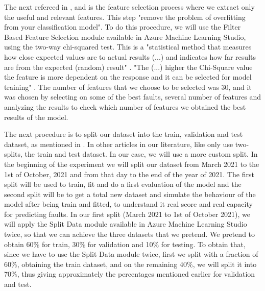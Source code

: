 The next refereed in \cite{ML_Data_processing}, \cite{N_4_WIND} and \cite{39_WIND} is the feature selection process where we extract only the useful and relevant features. This step "remove the problem of overfitting from your classification model". To do this procedure, we will use the Filter Based Feature Selection module available in Azure Machine Learning Studio, using the two-way chi-squared test. This is a "statistical method that measures how close expected values are to actual results (...) and indicates how far results are from the expected (random) result" \cite{AZURE_MACHINE_LEARNING}. "The (...) higher the Chi-Square value the feature is more dependent on the response and it can be selected for model training" \cite{TDC_ChiSquared}. The number of features that we choose to be selected was 30, and it was chosen by selecting on some of the best faults, several number of features and analyzing the results to check which number of features we obtained the best results of the model.

The next procedure is to split our dataset into the train, validation and test dataset, as mentioned in \cite{TDC_Train_Test_Split} \cite{TDC_TrainValidationTest}. In other articles in our literature, like \cite{Machine_Learning_Mistery_Train-Test-Split} \cite{ML_Data_processing} \cite{N_4_WIND} \cite{41_WIND} only use two-splits, the train and test dataset.
In our case, we will use a more custom split. In the beginning of the experiment we will split our dataset from March 2021 to the 1st of October, 2021 and from that day to the end of the year of 2021. The first split will be used to train, fit and do a first evaluation of the model and the second split will be to get a total new dataset and simulate the behaviour of the model after being train and fitted, to understand it real score and real capacity for predicting faults.
In our first split (March 2021 to 1st of October 2021), we will apply the Split Data module available in Azure Machine Learning Studio twice, so that we can achieve the three datasets that we pretend. We pretend to obtain 60\% for train, 30\% for validation and 10\% for testing. To obtain that, since we have to use the Split Data module twice, first we split with a fraction of 60\%, obtaining the train dataset, and on the remaining 40\%, we will split it into 70\%, thus giving approximately the percentages mentioned earlier for validation and test.

